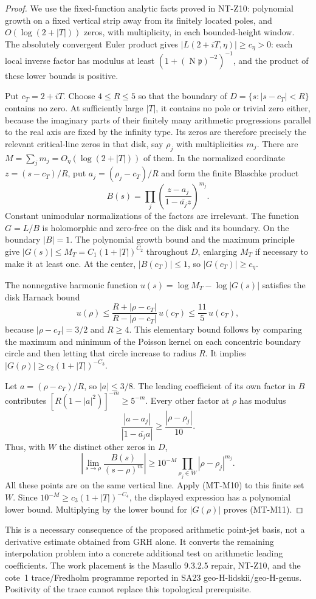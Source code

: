 \begin{proof}
We use the fixed-function analytic facts proved in NT-Z10:
polynomial growth on a fixed vertical strip away from its
finitely located poles, and $O(\log(2+|T|))$ zeros, with
multiplicity, in each bounded-height window.
The absolutely convergent Euler product gives
$|L(2+iT,\eta)|\ge c_\eta>0$: each local inverse factor
has modulus at least $(1+(\operatorname N\mathfrak p)^{-2})^{-1}$,
and the product of these lower bounds is positive.

Put $c_T=2+iT$. Choose $4\le R\le5$ so that the boundary of
$D=\{s:|s-c_T|<R\}$ contains no zero. At sufficiently large
$|T|$, it contains no pole or trivial zero either, because
the imaginary parts of their finitely many arithmetic
progressions parallel to the real axis are fixed by the infinity type.
Its zeros are therefore precisely the relevant critical-line
zeros in that disk, say $\rho_j$ with multiplicities $m_j$.
There are
$M=\sum_jm_j=O_\eta(\log(2+|T|))$ of them.
In the normalized coordinate $z=(s-c_T)/R$, put
$a_j=(\rho_j-c_T)/R$ and form the finite Blaschke product
\[
 B(s)=\prod_j
       \left(\frac{z-a_j}{1-\overline{a_j}z}\right)^{m_j}.
\]
Constant unimodular normalizations of the factors are
irrelevant. The function $G=L/B$ is holomorphic and zero-free
on the disk and its boundary. On the boundary $|B|=1$.
The polynomial growth bound and the maximum principle give
$|G(s)|\le M_T=C_1(1+|T|)^{C_2}$ throughout $D$, enlarging
$M_T$ if necessary to make it at least one.
At the center, $|B(c_T)|\le1$, so
$|G(c_T)|\ge c_\eta$.

The nonnegative harmonic function
$u(s)=\log M_T-\log|G(s)|$ satisfies the disk Harnack bound
\[
 u(\rho)\le
 \frac{R+|\rho-c_T|}{R-|\rho-c_T|}\,u(c_T)
 \le\frac{11}{5}\,u(c_T),
\]
because $|\rho-c_T|=3/2$ and $R\ge4$.
This elementary bound follows by comparing the maximum and
minimum of the Poisson kernel on each concentric boundary
circle and then letting that circle increase to radius $R$.
It implies $|G(\rho)|\ge c_2(1+|T|)^{-C_3}$.

Let $a=(\rho-c_T)/R$, so $|a|\le3/8$.
The leading coefficient of its own factor in $B$ contributes
$[R(1-|a|^2)]^{-m}\ge5^{-m}$.
Every other factor at $\rho$ has modulus
\[
 \frac{|a-a_j|}{|1-\overline{a_j}a|}
 \ge\frac{|\rho-\rho_j|}{10}.
\]
Thus, with $W$ the distinct other zeros in $D$,
\[
 \left|\lim_{s\to\rho}\frac{B(s)}{(s-\rho)^m}\right|
 \ge 10^{-M}\prod_{\rho_j\in W}|\rho-\rho_j|^{m_j}.
\]
All these points are on the same vertical line. Apply
(MT-M10) to this finite set $W$. Since
$10^{-M}\ge c_3(1+|T|)^{-C_4}$, the displayed expression
has a polynomial lower bound. Multiplying by the lower bound
for $|G(\rho)|$ proves (MT-M11).
\end{proof}

This is a necessary consequence of the proposed arithmetic
point-jet basis, not a derivative estimate obtained from GRH
alone. It converts the remaining interpolation problem into
a concrete additional test on arithmetic leading coefficients.
The work placement is the Masullo 9.3.2.5 repair, NT-Z10,
and the cote~1 trace/Fredholm programme reported in SA23
geo-H-lidskii/geo-H-genus. Positivity of the trace cannot
replace this topological prerequisite.
